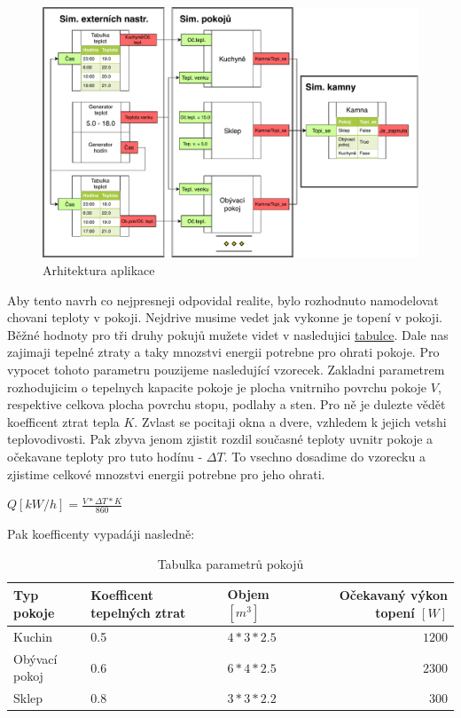 \begin{figure}[htb]
  \centering
  \includegraphics[width=\textwidth]{obrazky-figures/boiler-net.pdf}
  \caption{Arhitektura aplikace}
  \label{boiler-net}
\end{figure}

Aby tento navrh co nejpresneji odpovidal realite, bylo rozhodnuto namodelovat chovani teploty v pokoji.
Nejdrive musime vedet jak vykonne je topení v pokoji. Běžné hodnoty pro tři druhy pokujů mužete videt v nasledujici \hyperref[tab:TepelneZtraty]{tabulce}. Dale nas zajimaji tepelné ztraty a taky mnozstvi energii potrebne pro ohrati pokoje. Pro vypocet tohoto parametru pouzijeme nasledující vzorecek. Zakladni parametrem rozhodujicim o tepelnych kapacite pokoje je plocha vnitrniho povrchu pokoje $V$, respektive celkova plocha povrchu stopu, podlahy a sten. Pro ně je dulezte vědět koefficent ztrat tepla $K$. Zvlast se pocitaji okna a dvere, vzhledem k jejich vetshi teplovodivosti. Pak zbyva jenom zjistit rozdil současné teploty uvnitr pokoje a očekavane teploty pro tuto hodínu - $\Delta{T}$. To vsechno dosadime do vzorecku a zjistime celkové mnozstvi energii potrebne pro jeho ohrati. \cite{tep_calc}
\begin{center}
  $Q[kW/h] = \frac{V*\Delta{T}*K}{860}$
\end{center}

Pak koefficenty vypadáji nasledně:

\begin{table}[H]
	\vskip6pt
	\caption{Tabulka parametrů pokojů}
    \vskip6pt
	\centering
	\begin{tabular}{lllr}
		\toprule
		Typ pokoje & Koefficent tepelných ztrat & Objem $[m^3]$ & Očekavaný výkon topení $[W]$ \\
    \midrule
    Kuchin & 0.5 & $4*3*2.5$ & $1200$ \\
    Obývací pokoj & 0.6 & $6*4*2.5$ & $2300$ \\
    Sklep & 0.8 & $3*3*2.2$ & $300$ \\
		\bottomrule
	\end{tabular}
	\label{tab:Parametry}
\end{table}

